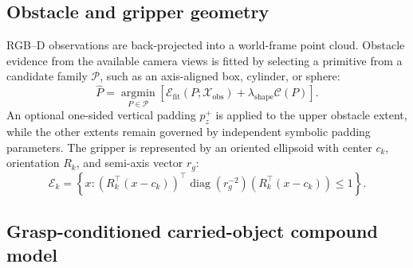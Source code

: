 \subsection{Obstacle and gripper geometry}

RGB--D observations are back-projected into a world-frame point cloud. Obstacle evidence from the available camera views is fitted by selecting a primitive from a candidate family $\mathcal{P}$, such as an axis-aligned box, cylinder, or sphere:
\begin{equation}
    \widehat{P}
    =\underset{P\in\mathcal{P}}{\operatorname{argmin}}
    \left[
        \mathcal{E}_{\mathrm{fit}}(P;\mathcal{X}_{\mathrm{obs}})
        +\lambda_{\mathrm{shape}}\mathcal{C}(P)
    \right].
\end{equation}
An optional one-sided vertical padding $p_z^{+}$ is applied to the upper obstacle extent, while the other extents remain governed by independent symbolic padding parameters. The gripper is represented by an oriented ellipsoid with center $c_k$, orientation $R_k$, and semi-axis vector $r_g$:
\begin{equation}
    \mathcal{E}_k
    =\left\{
        x:\left(R_k^{\top}(x-c_k)\right)^{\top}
        \operatorname{diag}(r_g^{-2})
        \left(R_k^{\top}(x-c_k)\right)\leq 1
    \right\}.
\end{equation}

\subsection{Grasp-conditioned carried-object compound model}

